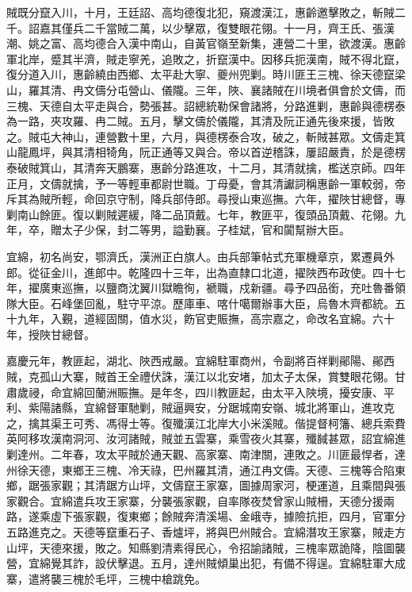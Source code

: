\begin{pinyinscope}
賊既分竄入川，十月，王廷詔、高均德復北犯，窺渡漢江，惠齡邀擊敗之，斬賊二千。詔嘉其僅兵二千當賊二萬，以少擊眾，復雙眼花翎。十一月，齊王氏、張漢潮、姚之富、高均德合入漢中南山，自黃官嶺至新集，連營二十里，欲渡漢。惠齡軍北岸，蹙其半濟，賊走寧羌，追敗之，折竄漢中。因移兵扼漢南，賊不得北竄，復分道入川，惠齡繞由西鄉、太平赴大寧、夔州兜剿。時川匪王三槐、徐天德竄梁山，羅其清、冉文儔分屯營山、儀隴。三年，陜、襄諸賊在川境者俱會於文儔，而三槐、天德自太平走與合，勢張甚。詔總統勒保會諸將，分路進剿，惠齡與德楞泰為一路，夾攻羅、冉二賊。五月，擊文儔於儀隴，其清及阮正通先後來援，皆敗之。賊屯大神山，連營數十里，六月，與德楞泰合攻，破之，斬賊甚眾。文儔走箕山龍鳳坪，與其清相犄角，阮正通等又與合。帝以首逆稽誅，屢詔嚴責，於是德楞泰破賊箕山，其清奔天鵬寨，惠齡分路進攻，十二月，其清就擒，檻送京師。四年正月，文儔就擒，予一等輕車都尉世職。丁母憂，會其清讞詞稱惠齡一軍較弱，帝斥其為賊所輕，命回京守制，降兵部侍郎。尋授山東巡撫。六年，擢陜甘總督，專剿南山餘匪。復以剿賊遲緩，降二品頂戴。七年，教匪平，復頭品頂戴、花翎。九年，卒，贈太子少保，封二等男，謚勤襄。子桂斌，官和闐幫辦大臣。

宜綿，初名尚安，鄂濟氏，漢洲正白旗人。由兵部筆帖式充軍機章京，累遷員外郎。從征金川，進郎中。乾隆四十三年，出為直隸口北道，擢陜西布政使。四十七年，擢廣東巡撫，以鹽商沈翼川獄瞻徇，褫職，戍新疆。尋予四品銜，充吐魯番領隊大臣。石峰堡回亂，駐守平涼。歷庫車、喀什噶爾辦事大臣，烏魯木齊都統。五十九年，入覲，道經固關，值水災，飭官吏賑撫，高宗嘉之，命改名宜綿。六十年，授陜甘總督。

嘉慶元年，教匪起，湖北、陜西戒嚴。宜綿駐軍商州，令副將百祥剿鄖陽、鄖西賊，克孤山大寨，賊首王全禮伏誅，漢江以北安堵，加太子太保，賞雙眼花翎。甘肅歲祲，命宜綿回蘭洲賑撫。是年冬，四川教匪起，由太平入陜境，擾安康、平利、紫陽諸縣，宜綿督軍馳剿，賊逼興安，分踞城南安嶺、城北將軍山，進攻克之，擒其渠王可秀、馮得士等。復殲漢江北岸大小米溪賊。偕提督柯籓、總兵索費英阿移攻漢南洞河、汝河諸賊，賊並五雲寨，乘雪夜火其寨，殲馘甚眾，詔宜綿進剿達州。二年春，攻太平賊於通天觀、高家寨、南津關，連敗之。川匪最悍者，達州徐天德，東鄉王三槐、冷天祿，巴州羅其清，通江冉文儔。天德、三槐等合陷東鄉，踞張家觀；其清踞方山坪，文儔竄王家寨，圖據周家河，梗運道，且乘間與張家觀合。宜綿遣兵攻王家寨，分襲張家觀，自率隊夜焚曾家山賊柵，天德分援兩路，遂乘虛下張家觀，復東鄉；餘賊奔清溪場、金峨寺，據險抗拒，四月，官軍分五路進克之。天德等竄重石子、香爐坪，將與巴州賊合。宜綿潛攻王家寨，賊走方山坪，天德來援，敗之。知縣劉清素得民心，令招諭諸賊，三槐率眾詭降，陰圖襲營，宜綿覺其詐，設伏擊退。五月，達州賊傾巢出犯，有備不得逞。宜綿駐軍大成寨，遣將襲三槐於毛坪，三槐中槍跳免。


\end{pinyinscope}
